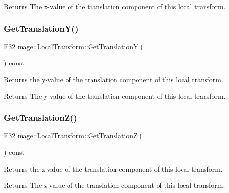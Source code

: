 \begin{DoxyReturn}{Returns}
The x-\/value of the translation component of this local transform. 
\end{DoxyReturn}
\hypertarget{classmage_1_1_local_transform_a31441b5c6cca77b6f0e8c5cc9c3bf3f0}{}\label{classmage_1_1_local_transform_a31441b5c6cca77b6f0e8c5cc9c3bf3f0} 
\subsubsection{\texorpdfstring{Get\+Translation\+Y()}{GetTranslationY()}}
{\footnotesize\ttfamily \hyperlink{namespacemage_aa97e833b45f06d60a0a9c4fc22ae02c0}{F32} mage\+::\+Local\+Transform\+::\+Get\+TranslationY (\begin{DoxyParamCaption}{ }\end{DoxyParamCaption}) const\hspace{0.3cm}{\ttfamily [noexcept]}}

Returns the y-\/value of the translation component of this local transform.

\begin{DoxyReturn}{Returns}
The y-\/value of the translation component of this local transform. 
\end{DoxyReturn}
\hypertarget{classmage_1_1_local_transform_a09d94a592dab22c23e664402144d75bc}{}\label{classmage_1_1_local_transform_a09d94a592dab22c23e664402144d75bc} 
\subsubsection{\texorpdfstring{Get\+Translation\+Z()}{GetTranslationZ()}}
{\footnotesize\ttfamily \hyperlink{namespacemage_aa97e833b45f06d60a0a9c4fc22ae02c0}{F32} mage\+::\+Local\+Transform\+::\+Get\+TranslationZ (\begin{DoxyParamCaption}{ }\end{DoxyParamCaption}) const\hspace{0.3cm}{\ttfamily [noexcept]}}

Returns the z-\/value of the translation component of this local transform.

\begin{DoxyReturn}{Returns}
The z-\/value of the translation component of this local transform. 
\end{DoxyReturn}
\hypertarget{classmage_1_1_local_transform_a518f40cfd7973289b692057d30765741}{}\label{classmage_1_1_local_transform_a518f40cfd7973289b692057d30765741} 
